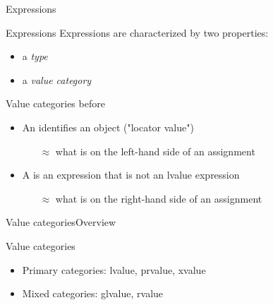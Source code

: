 \begin{frame}{Expressions}{}
  \begin{block}{Expressions}
    Expressions are characterized by two properties:
    \begin{itemize}
    \item
      a \emph{type}
    \item
      a \emph{value category}
    \end{itemize}
  \end{block}

  \begin{block}{Value categories before }
    \begin{itemize}
    \item
      An  identifies an object ("locator value")
      \begin{itemize}
      \item[$\approx$]
        what is on the left-hand side  of an assignment
      \end{itemize}
    \item
      A  is an expression that is not an lvalue expression
      \begin{itemize}
      \item[$\approx$]
        what is on the right-hand side of an assignment
      \end{itemize}
    \end{itemize}
  \end{block}
\end{frame}

\begin{frame}{Value categories}{Overview}
  \begin{block}{Value categories}
    \begin{itemize}
    \item
      Primary categories: lvalue, prvalue, xvalue
    \item
      Mixed categories: glvalue, rvalue
    \end{itemize}
  \end{block}

  \begin{center}
  \end{center}
\end{frame}

